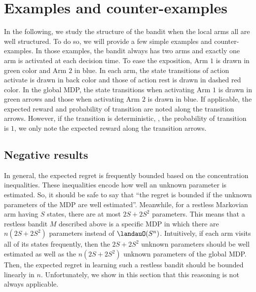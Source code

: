 \section{Examples and counter-examples}
\label{ch:restless:sec:example}

In the following, we study the structure of the bandit when the local arms all are well structured.
To do so, we will provide a few simple examples and counter-examples.
In those examples, the bandit always has two arms and exactly one arm is activated at each decision time.
To ease the exposition, Arm $1$ is drawn in green color and Arm $2$ in blue.
In each arm, the state transitions of action activate is drawn in back color and those of action rest is drawn in dashed red color.
In the global MDP, the state transitions when activating Arm $1$ is drawn in green arrows and those when activating Arm $2$ is drawn in blue.
If applicable, the expected reward and probability of transition are noted along the transition arrows.
However, if the transition is deterministic, \ie, the probability of transition is $1$, we only note the expected reward along the transition arrows.

\subsection{Negative results}

In general, the expected regret is frequently bounded based on the concentration inequalities. 
These inequalities encode how well an unknown parameter is estimated.
So, it should be safe to say that ``the regret is bounded if the unknown parameters of the MDP are well estimated''.
Meanwhile, for a restless Markovian arm having $S$ states, there are at most $2S+2S^2$ parameters.
This means that a restless bandit $M$ described above is a specific MDP in which there are $n(2S+2S^2)$ parameters instead of $\landauO(S^{n})$.
Intuitively, if each arm visits all of its states frequently, then the $2S+2S^2$ unknown parameters should be well estimated as well as the $n(2S+2S^2)$ unknown parameters of the global MDP.
Then, the expected regret in learning such a restless bandit should be bounded linearly in $n$.
Unfortunately, we show in this section that this reasoning is not always applicable. 

